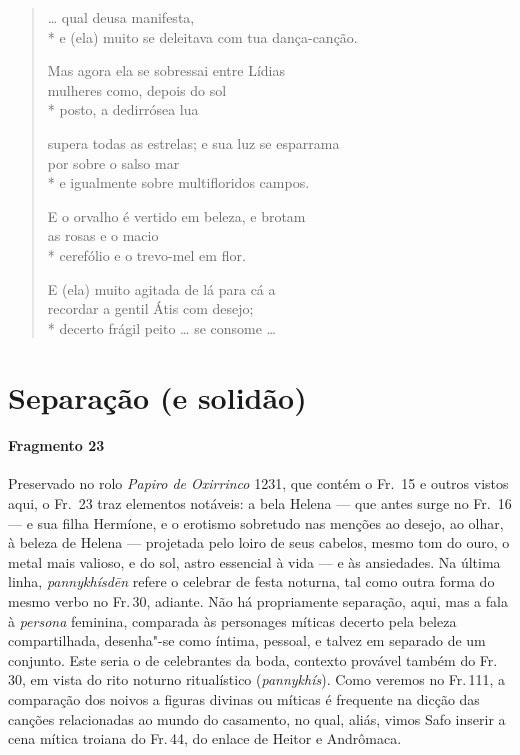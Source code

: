 \begin{verse}
\ldots{} qual deusa manifesta,\\*
e (ela) muito se deleitava com tua dança-canção.

Mas agora ela se sobressai entre Lídias\\
mulheres como, depois do sol\\*
posto, a dedirrósea lua

supera todas as estrelas; e sua luz se esparrama\\
por sobre o salso mar \\*
e igualmente sobre multifloridos campos.

E o orvalho é vertido em beleza, e brotam\\
as rosas e o macio \\*
cerefólio e o trevo-mel em flor.

E (ela) muito agitada de lá para cá a \\
recordar a gentil Átis com desejo;\\*
decerto frágil peito \ldots{} se consome \ldots{}
\end{verse}


\section{Separação (e solidão)}

\paragraph{Fragmento 23}

{\small Preservado no rolo \textit{Papiro de Oxirrinco} 1231, que contém o Fr.~15 e outros vistos aqui, o Fr.~23 traz elementos notáveis: a bela Helena --- que antes surge no Fr.~16 --- e sua filha Hermíone, e o erotismo sobretudo nas menções ao desejo, ao olhar, à beleza de Helena --- projetada pelo loiro de seus cabelos, mesmo tom do ouro, o metal mais valioso, e do sol, astro essencial à vida --- e às ansiedades. Na última linha, \textit{pannykhísdēn} refere o celebrar de festa noturna, tal como outra forma do mesmo verbo no Fr.\,30, adiante. Não há propriamente separação, aqui, mas a fala à \textit{persona} feminina, comparada às personages míticas decerto pela beleza compartilhada, desenha"-se como íntima, pessoal, e talvez em separado de um conjunto. Este seria o de celebrantes da boda, contexto provável também do Fr.\,30, em vista do rito noturno ritualístico (\textit{pannykhís}). Como veremos no Fr.\,111, a comparação dos noivos a figuras divinas ou míticas é frequente na dicção das canções relacionadas ao mundo do casamento, no qual, aliás, vimos Safo inserir a cena mítica troiana do Fr.\,44, do enlace de Heitor e Andrômaca.}

